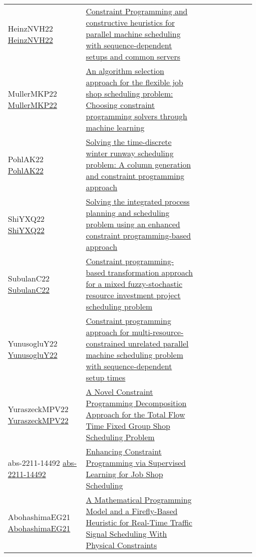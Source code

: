 {\begin{longtable}{p{3cm}p{7cm}lllllll}
HeinzNVH22 \href{https://doi.org/10.1016/j.cie.2022.108586}{HeinzNVH22} &  \href{articles/HeinzNVH22.pdf}{Constraint Programming and constructive heuristics for parallel machine scheduling with sequence-dependent setups and common servers} &  &  &  &  &  &  & \\
MullerMKP22 \href{https://doi.org/10.1016/j.ejor.2022.01.034}{MullerMKP22} &  \href{articles/MullerMKP22.pdf}{An algorithm selection approach for the flexible job shop scheduling problem: Choosing constraint programming solvers through machine learning} &  &  &  &  &  &  & \\
PohlAK22 \href{https://doi.org/10.1016/j.ejor.2021.08.028}{PohlAK22} &  \href{articles/PohlAK22.pdf}{Solving the time-discrete winter runway scheduling problem: {A} column generation and constraint programming approach} &  &  &  &  &  &  & \\
ShiYXQ22 \href{https://doi.org/10.1080/00207543.2021.1963496}{ShiYXQ22} &  \href{}{Solving the integrated process planning and scheduling problem using an enhanced constraint programming-based approach} &  &  &  &  &  &  & \\
SubulanC22 \href{https://doi.org/10.1007/s00500-021-06399-5}{SubulanC22} &  \href{articles/SubulanC22.pdf}{Constraint programming-based transformation approach for a mixed fuzzy-stochastic resource investment project scheduling problem} &  &  &  &  &  &  & \\
YunusogluY22 \href{https://doi.org/10.1080/00207543.2021.1885068}{YunusogluY22} &  \href{}{Constraint programming approach for multi-resource-constrained unrelated parallel machine scheduling problem with sequence-dependent setup times} &  &  &  &  &  &  & \\
YuraszeckMPV22 \href{https://api.semanticscholar.org/CorpusID:246320449}{YuraszeckMPV22} &  \href{articles/YuraszeckMPV22.pdf}{A Novel Constraint Programming Decomposition Approach for the Total Flow Time Fixed Group Shop Scheduling Problem} &  &  &  &  &  &  & \\
abs-2211-14492 \href{https://doi.org/10.48550/arXiv.2211.14492}{abs-2211-14492} &  \href{articles/abs-2211-14492.pdf}{Enhancing Constraint Programming via Supervised Learning for Job Shop Scheduling} &  &  &  &  &  &  & \\
AbohashimaEG21 \href{https://doi.org/10.1109/ACCESS.2021.3112600}{AbohashimaEG21} &  \href{articles/AbohashimaEG21.pdf}{A Mathematical Programming Model and a Firefly-Based Heuristic for Real-Time Traffic Signal Scheduling With Physical Constraints} &  &  &  &  &  &  & \\

\end{longtable}}
